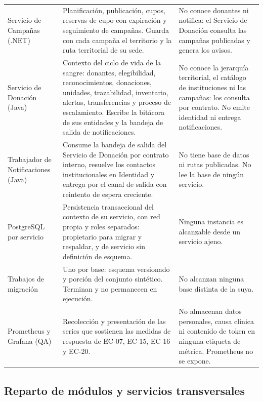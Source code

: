 \documentclass[11pt,a4paper]{article}
\begin{document}
\begin{longtable}{L{3.0cm} L{5.6cm} L{5.6cm}}
Servicio de Campañas (.NET) & Planificación, publicación, cupos, reservas de cupo con expiración y seguimiento de campañas. Guarda con cada campaña el territorio y la ruta territorial de su sede. & No conoce donantes ni notifica: el Servicio de Donación consulta las campañas publicadas y genera los avisos. \\
Servicio de Donación (Java) & Contexto del ciclo de vida de la sangre: donantes, elegibilidad, reconocimientos, donaciones, unidades, trazabilidad, inventario, alertas, transferencias y proceso de escalamiento. Escribe la bitácora de sus entidades y la bandeja de salida de notificaciones. & No conoce la jerarquía territorial, el catálogo de instituciones ni las campañas: los consulta por contrato. No emite identidad ni entrega notificaciones. \\
Trabajador de Notificaciones (Java) & Consume la bandeja de salida del Servicio de Donación por contrato interno, resuelve los contactos institucionales en Identidad y entrega por el canal de salida con reintento de espera creciente. & No tiene base de datos ni rutas publicadas. No lee la base de ningún servicio. \\
PostgreSQL por servicio & Persistencia transaccional del contexto de su servicio, con red propia y roles separados: propietario para migrar y respaldar, y de servicio sin definición de esquema. & Ninguna instancia es alcanzable desde un servicio ajeno. \\
Trabajos de migración & Uno por base: esquema versionado y porción del conjunto sintético. Terminan y no permanecen en ejecución. & No alcanzan ninguna base distinta de la suya. \\
Prometheus y Grafana (QA) & Recolección y presentación de las series que sostienen las medidas de respuesta de EC-07, EC-15, EC-16 y EC-20. & No almacenan datos personales, causa clínica ni contenido de token en ninguna etiqueta de métrica. Prometheus no se expone. \\
\end{longtable}

\subsection{Reparto de módulos y servicios transversales}
\end{document}
